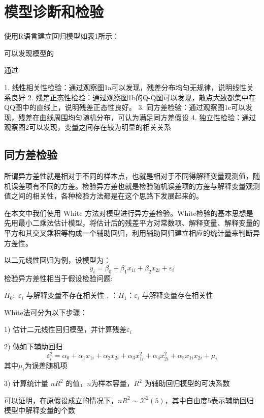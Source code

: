 \documentclass [a4paper]{article}
\begin{document}
\begin{table}
\begin{tabular}{ccccc}
  \end{tabular}


\end{table}


\section{模型诊断和检验}

使用R语言建立回归模型如表1所示：

可以发现模型的

通过

1. 线性相关性检验：通过观察图1a可以发现，残差分布均匀无规律，说明线性关系良好
2. 残差正态性检验：通过观察图1b的Q-Q图可以发现，散点大致都集中在QQ图中的直线上，说明残差正态性良好。
3. 同方差检验：通过观察图1c可以发现，残差在曲线周围均匀随机分布，可认为满足同方差假设
4. 独立性检验：通过观察图2可以发现，变量之间存在较为明显的相关关系

\subsection{同方差检验}

所谓异方差性就是相对于不同的样本点，也就是相对于不同得解释变量观测值，随机误差项有不同的方差。检验异方差也就是检验随机误差项的方差与解释变量观测值之间的相关性，各种检验方法都是在这个思路下发展起来的。

在本文中我们使用 White 方法对模型进行异方差检验。White检验的基本思想是先用最小二乘法估计模型，将估计后的残差平方对常数项、解释变量、解释变量的平方和其交叉乘积等构成一个辅助回归，利用辅助回归建立相应的统计量来判断异方差性。

以二元线性回归为例，设模型为：
$$
y_i = \beta_0 +\beta_1x_{1i}+\beta_2x_{2i}+\varepsilon_i
$$
检验异方差性相当于假设检验问题:

$H_0:$ $\varepsilon_i$ 与解释变量不存在相关性 ,  $：H_1：$ ​ $\varepsilon_i$ 与解释变量存在相关性

White法可分为以下步骤：

1) 估计二元线性回归模型，并计算残差$\varepsilon_i$

2) 做如下辅助回归
$$
\varepsilon_i^2 = \alpha_0 +\alpha_1x_{1i}+\alpha_2x_{2i}+\alpha_3x_{1i}^2+\alpha_4x_{2i}^2+\alpha_5x_{1i}x_{2i}+\mu_i
$$
其中$\mu_i$为误差随机项

3) 计算统计量 $nR^2$ 的值，$n$为样本容量，$R^2$ 为辅助回归模型的可决系数

可以证明，在原假设成立的情况下，$nR^2 \sim \mathcal{X}^2(5)$，其中自由度5表示辅助回归模型中解释变量的个数
\end{document}
